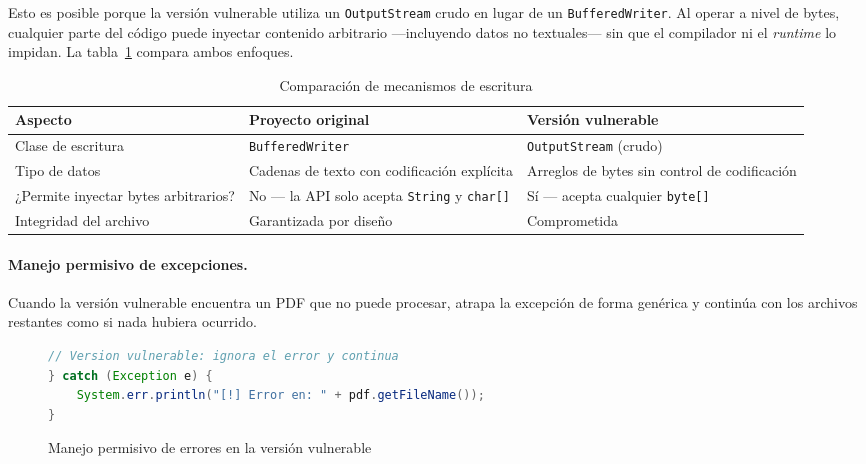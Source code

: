 Esto es posible porque la versión vulnerable utiliza un \texttt{OutputStream} crudo en lugar de un
\texttt{BufferedWriter}. Al operar a nivel de bytes, cualquier parte del código puede inyectar
contenido arbitrario —incluyendo datos no textuales— sin que el compilador ni el \textit{runtime}
lo impidan. La tabla~\ref{tab:vuln-writer-vs-stream} compara ambos enfoques.

\begin{table}[H]
\centering
\caption{Comparación de mecanismos de escritura}
\label{tab:vuln-writer-vs-stream}
\begin{tabular}{|p{3.5cm}|p{5cm}|p{5cm}|}
\hline
\textbf{Aspecto} & \textbf{Proyecto original} & \textbf{Versión vulnerable} \\
\hline
Clase de escritura & \texttt{BufferedWriter} & \texttt{OutputStream} (crudo) \\
\hline
Tipo de datos & Cadenas de texto con codificación explícita & Arreglos de bytes sin control de codificación \\
\hline
¿Permite inyectar bytes arbitrarios? & No — la API solo acepta \texttt{String} y \texttt{char[]} & Sí — acepta cualquier \texttt{byte[]} \\
\hline
Integridad del archivo & Garantizada por diseño & Comprometida \\
\hline
\end{tabular}
\end{table}

\paragraph{Manejo permisivo de excepciones.}
Cuando la versión vulnerable encuentra un PDF que no puede procesar, atrapa la excepción
de forma genérica y continúa con los archivos restantes como si nada hubiera ocurrido.

\begin{figure}[H]
    \centering
    \begin{minipage}{0.9\textwidth}
    \caption{Manejo permisivo de errores en la versión vulnerable}
    \label{code:vuln-exception}
    \vspace{-0.2cm}
    \begin{lstlisting}[language=Java, basicstyle=\scriptsize\ttfamily]
// Version vulnerable: ignora el error y continua
} catch (Exception e) {
    System.err.println("[!] Error en: " + pdf.getFileName());
}
    \end{lstlisting}
    \end{minipage}
\end{figure}

